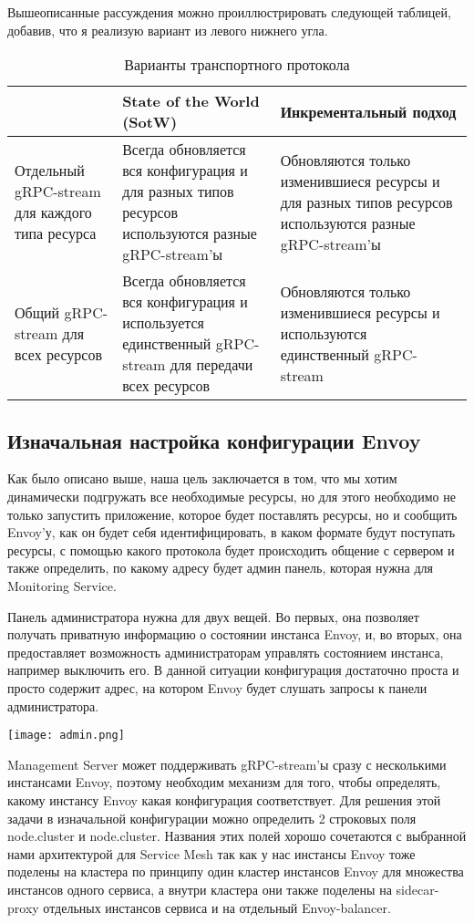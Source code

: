 Вышеописанные рассуждения можно проиллюстрировать следующей таблицей, добавив, что я реализую вариант из левого нижнего угла.
\begin{table}[ht]
\small
\centering
\begin{tabular}{ p{30mm} | p{30mm} |  p{30mm} }
                      &  State of the World (SotW) & Инкрементальный подход \\
\hline
Отдельный gRPC-stream для каждого типа ресурса   & Всегда обновляется вся конфигурация и для разных типов ресурсов используются разные gRPC-stream'ы & Обновляются только изменившиеся ресурсы и для разных типов ресурсов используются разные gRPC-stream'ы \\
\hline
Общий gRPC-stream для всех ресурсов                 & Всегда обновляется вся конфигурация и используется единственный gRPC-stream для передачи всех ресурсов & Обновляются только изменившиеся ресурсы и  используются единственный gRPC-stream \\
\end{tabular}
\caption{Варианты транспортного протокола}
\end{table}

\subsection{Изначальная настройка конфигурации Envoy}

Как было описано выше, наша цель заключается в том, что мы хотим динамически подгружать все необходимые ресурсы, но для этого необходимо не только запустить приложение, которое будет поставлять ресурсы, но и сообщить Envoy'у, как он будет себя идентифицировать, в каком формате будут поступать ресурсы, с помощью какого протокола будет происходить общение с сервером и также определить, по какому адресу будет админ панель, которая нужна для Monitoring Service.

Панель администратора нужна для двух вещей. Во первых, она позволяет получать приватную информацию о состоянии инстанса Envoy, и, во вторых, она предоставляет возможность администраторам управлять состоянием инстанса, например выключить его. В данной ситуации конфигурация достаточно проста и просто содержит адрес, на котором Envoy будет слушать запросы к панели администратора.

\texttt{[image: admin.png]}

Management Server может поддерживать gRPC-stream'ы сразу с несколькими инстансами Envoy, поэтому необходим механизм для того, чтобы определять, какому инстансу Envoy какая конфигурация соответствует. Для решения этой задачи в изначальной конфигурации можно определить 2 строковых поля node.cluster и node.cluster. Названия этих полей хорошо сочетаются с выбранной нами архитектурой для Service Mesh так как у нас инстансы Envoy тоже поделены на кластера по принципу один кластер инстансов Envoy для множества инстансов одного сервиса, а внутри кластера они также поделены на sidecar-proxy отдельных инстансов сервиса и на отдельный Envoy-balancer.

